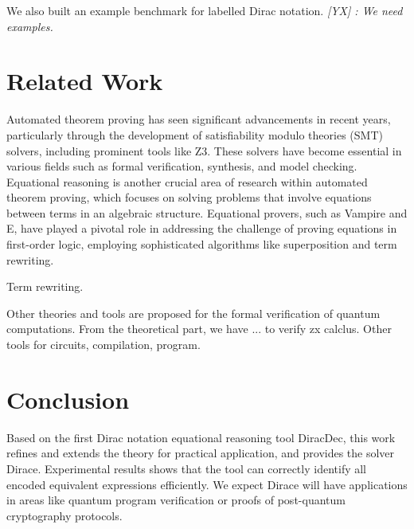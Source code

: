\documentclass[runningheads]{llncs}
\newcommand{\yx}[1]{\textit{\color{blue}[YX] : #1}}
\begin{document}
We also built an example benchmark for labelled Dirac notation.
\yx{We need examples.}


\section{Related Work}

Automated theorem proving has seen significant advancements in recent years, particularly through the development of satisfiability modulo theories (SMT) solvers,
including prominent tools like Z3. These solvers have become essential in various fields such as formal verification, synthesis, and model checking. 
Equational reasoning is another crucial area of research within automated theorem proving, which focuses on solving problems that involve equations between terms in an algebraic structure. 
Equational provers, such as Vampire and E, have played a pivotal role in addressing the challenge of proving equations in first-order logic, employing sophisticated algorithms like superposition and term rewriting.

Term rewriting.

Other theories and tools are proposed for the formal verification of quantum computations.
From the theoretical part, we have ... to verify zx calclus. Other tools for circuits, compilation, program.




\section{Conclusion}
Based on the first Dirac notation equational reasoning tool DiracDec, this work refines and extends the theory for practical application, and provides the solver Dirace. Experimental results shows that the tool can correctly identify all encoded equivalent expressions efficiently. 
We expect Dirace will have applications in areas like quantum program verification or proofs of post-quantum cryptography protocols.



    
    


%
%
%


%

\appendix

\end{document}
